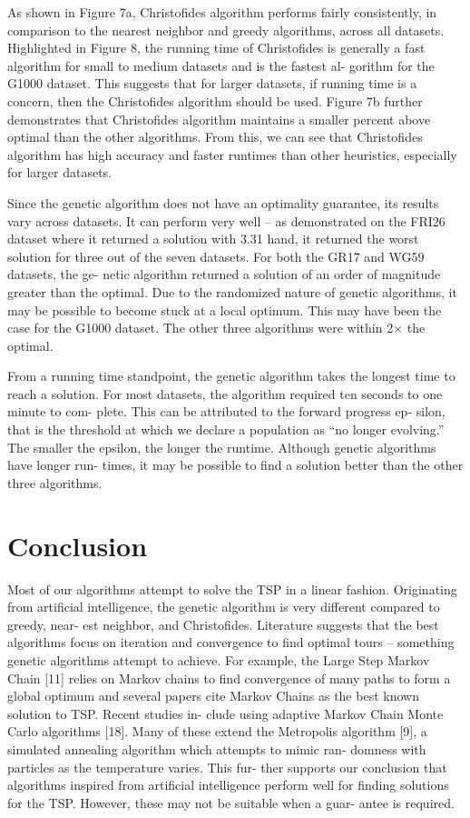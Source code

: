 \documentclass[10pt,twocolumn,letterpaper]{article}
\begin{document}
As shown in Figure 7a, Christofides algorithm performs
fairly consistently, in comparison to the nearest neighbor
and greedy algorithms, across all datasets. Highlighted in
Figure 8, the running time of Christofides is generally a fast
algorithm for small to medium datasets and is the fastest al-
gorithm for the G1000 dataset. This suggests that for larger
datasets, if running time is a concern, then the Christofides
algorithm should be used. Figure 7b further demonstrates
that Christofides algorithm maintains a smaller percent above
optimal than the other algorithms. From this, we can see
that Christofides algorithm has high accuracy and faster
runtimes than other heuristics, especially for larger datasets.

Since the genetic algorithm does not have an optimality
guarantee, its results vary across datasets. It can perform
very well – as demonstrated on the FRI26 dataset where it
returned a solution with 3.31%
hand, it returned the worst solution for three out of the seven
datasets. For both the GR17 and WG59 datasets, the ge-
netic algorithm returned a solution of an order of magnitude
greater than the optimal. Due to the randomized nature of
genetic algorithms, it may be possible to become stuck at a
local optimum. This may have been the case for the G1000
dataset. The other three algorithms were within 2× the
optimal.

From a running time standpoint, the genetic algorithm
takes the longest time to reach a solution. For most datasets,
the algorithm required ten seconds to one minute to com-
plete. This can be attributed to the forward progress ep-
silon, that is the threshold at which we declare a population
as “no longer evolving.” The smaller the epsilon, the longer
the runtime. Although genetic algorithms have longer run-
times, it may be possible to find a solution better than the
other three algorithms.

\section{Conclusion}
Most of our algorithms attempt to solve the TSP in a
linear fashion. Originating from artificial intelligence, the
genetic algorithm is very different compared to greedy, near-
est neighbor, and Christofides. Literature suggests that the
best algorithms focus on iteration and convergence to find
optimal tours – something genetic algorithms attempt to
achieve. For example, the Large Step Markov Chain [11]
relies on Markov chains to find convergence of many paths
to form a global optimum and several papers cite Markov
Chains as the best known solution to TSP. Recent studies in-
clude using adaptive Markov Chain Monte Carlo algorithms
[18]. Many of these extend the Metropolis algorithm [9], a
simulated annealing algorithm which attempts to mimic ran-
domness with particles as the temperature varies. This fur-
ther supports our conclusion that algorithms inspired from
artificial intelligence perform well for finding solutions for
the TSP. However, these may not be suitable when a guar-
antee is required.
\end{document}
